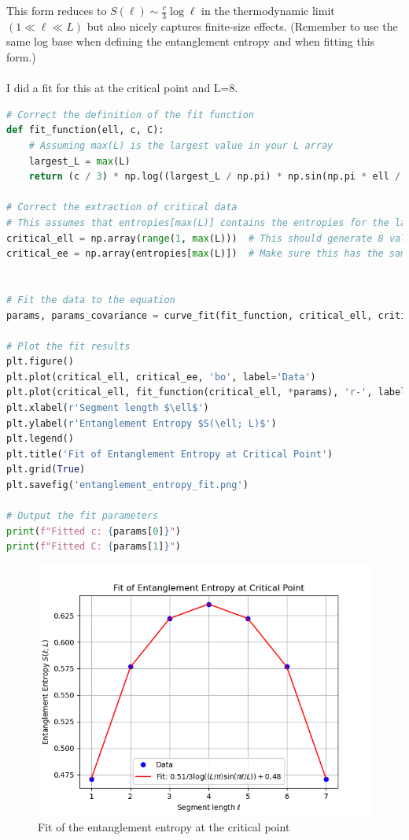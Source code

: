 \documentclass[12pt]{article}
\begin{document}
This form reduces to $S(\ell) \sim \frac{c}{3} \log \ell$ in the thermodynamic limit $(1 \ll \ell \ll L)$ but also nicely captures finite-size effects. (Remember to use the same log base when defining the entanglement entropy and when fitting this form.)\\\\
I did a fit for this at the critical point and L=8.
\begin{lstlisting}[language=Python]
# Correct the definition of the fit function
def fit_function(ell, c, C):
    # Assuming max(L) is the largest value in your L array
    largest_L = max(L)  
    return (c / 3) * np.log((largest_L / np.pi) * np.sin(np.pi * ell / largest_L)) + C

# Correct the extraction of critical data
# This assumes that entropies[max(L)] contains the entropies for the largest system size at the critical point h=1
critical_ell = np.array(range(1, max(L)))  # This should generate 8 values if max(L) is 8
critical_ee = np.array(entropies[max(L)])  # Make sure this has the same number of values as critical_ell


# Fit the data to the equation
params, params_covariance = curve_fit(fit_function, critical_ell, critical_ee)

# Plot the fit results
plt.figure()
plt.plot(critical_ell, critical_ee, 'bo', label='Data')
plt.plot(critical_ell, fit_function(critical_ell, *params), 'r-', label=f'Fit: ${params[0]:.2f}/3 \log((L/\pi) \sin(\pi \ell / L)) + {params[1]:.2f}$')
plt.xlabel(r'Segment length $\ell$')
plt.ylabel(r'Entanglement Entropy $S(\ell; L)$')
plt.legend()
plt.title('Fit of Entanglement Entropy at Critical Point')
plt.grid(True)
plt.savefig('entanglement_entropy_fit.png')

# Output the fit parameters
print(f"Fitted c: {params[0]}")
print(f"Fitted C: {params[1]}")


\end{lstlisting}
\begin{figure}
\centering
\includegraphics[width=\textwidth]{entanglement_entropy_fit.png}
\caption{Fit of the entanglement entropy at the critical point}
\end{figure}
\newpage
\end{document}
